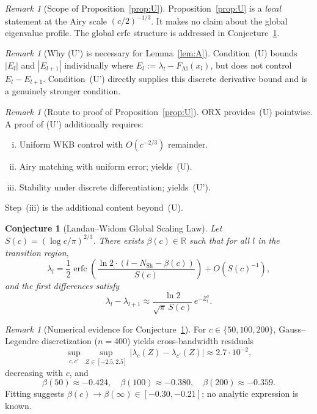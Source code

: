\documentclass[12pt]{amsart}
\newtheorem{conjecture}[theorem]{Conjecture}
\theoremstyle{definition}
\theoremstyle{remark}
\newtheorem{remark}[theorem]{Remark}
\newcommand{\FAi}{F_{\mathrm{Ai}}}
\newcommand{\NSh}{N_{\mathrm{Sh}}}
\begin{document}
\begin{remark}[Scope of Proposition~\ref{prop:U}]
\label{rem:propU_scope}
Proposition~\ref{prop:U} is a \emph{local} statement
at the Airy scale $(c/2)^{-1/3}$.
It makes no claim about the global eigenvalue profile.
The global erfc structure is addressed in
Conjecture~\ref{conj:ULW}.
\end{remark}

\begin{remark}[Why (U') is necessary for Lemma~\ref{lem:A}]
\label{rem:propU_uprime}
Condition~(U) bounds $|E_l|$ and $|E_{l+1}|$
individually where $E_l := \lambda_l - \FAi(x_l)$,
but does not control $E_l - E_{l+1}$.
Condition~(U') directly supplies this discrete
derivative bound and is a genuinely stronger condition.
\end{remark}

\begin{remark}[Route to proof of Proposition~\ref{prop:U}]
\label{rem:propU_route}
ORX \cite{OsipovRokhlinXiao} provides~(U) pointwise.
A proof of (U') additionally requires:
\begin{enumerate}[(i)]
\item Uniform WKB control with $O(c^{-2/3})$ remainder.
\item Airy matching with uniform error; yields~(U).
\item Stability under discrete differentiation;
  yields~(U').
\end{enumerate}
Step~(iii) is the additional content beyond~(U).
\end{remark}

\begin{conjecture}[Landau--Widom Global Scaling Law]
\label{conj:ULW}
Let $S(c) = (\log c/\pi)^{2/3}$.
There exists $\beta(c) \in \mathbb{R}$ such that
for all $l$ in the transition region,
\[
  \lambda_l = \frac{1}{2}
  \operatorname{erfc}\!\left(
  \frac{\ln 2 \cdot (l - \NSh - \beta(c))}{S(c)}
  \right)
  + O(S(c)^{-1}),
\]
and the first differences satisfy
\[
  \lambda_l - \lambda_{l+1}
  \approx \frac{\ln 2}{\sqrt{\pi}\,S(c)}\,e^{-Z_l^2}.
\]
\end{conjecture}

\begin{remark}[Numerical evidence for Conjecture~\ref{conj:ULW}]
\label{rem:ULW_numerics}
For $c \in \{50,100,200\}$, Gauss--Legendre
discretization ($n=400$) yields cross-bandwidth residuals
\[
  \sup_{c,c'}\sup_{Z \in [-2.5,2.5]}
  |\lambda_c(Z) - \lambda_{c'}(Z)| \approx 2.7 \cdot 10^{-2},
\]
decreasing with $c$, and
\[
  \beta(50)\approx -0.424,\quad
  \beta(100)\approx -0.380,\quad
  \beta(200)\approx -0.359.
\]
Fitting suggests $\beta(c) \to \beta(\infty)
\in [-0.30,-0.21]$; no analytic expression is known.
\end{remark}
\end{document}
